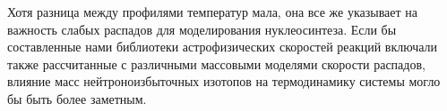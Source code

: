 Хотя разница между профилями температур мала, она все же указывает на важность слабых распадов для моделирования нуклеосинтеза. Если бы составленные нами библиотеки астрофизических скоростей реакций включали также рассчитанные с различными массовыми моделями скорости распадов, влияние масс нейтроноизбыточных изотопов на термодинамику системы могло бы быть более заметным.
